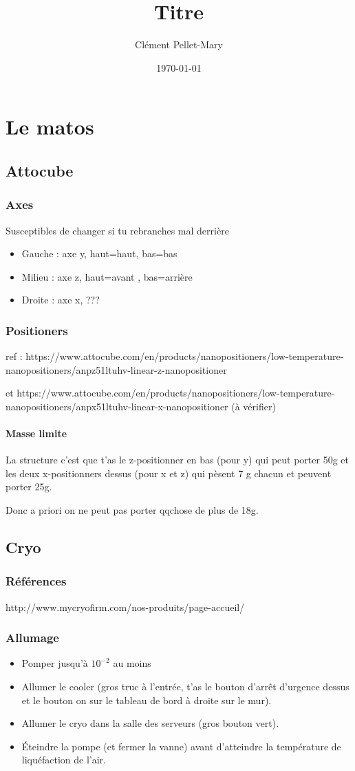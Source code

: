 \documentclass[a4paper]{report}
\title{Titre}
\author{Clément Pellet-Mary}
\date\today
\begin{document}
\chapter{Le matos}
  \section{Attocube}
  \subsection{Axes}
  Susceptibles de changer si tu rebranches mal derrière
  \begin{itemize}
  \item Gauche : axe y, haut=haut, bas=bas
  \item Milieu : axe z, haut=avant , bas=arrière
  \item Droite : axe x, ???
  \end{itemize}
  \subsection{Positioners}
  ref : https://www.attocube.com/en/products/nanopositioners/low-temperature-nanopositioners/anpz51ltuhv-linear-z-nanopositioner 
  
  et https://www.attocube.com/en/products/nanopositioners/low-temperature-nanopositioners/anpx51ltuhv-linear-x-nanopositioner (à vérifier)
  
  \subsubsection{Masse limite}
  La structure c'est que t'as le z-positionner en bas (pour y) qui peut porter 50g et les deux x-positionners dessus (pour x et z) qui pèsent 7 g chacun et peuvent porter 25g.
  
  Donc a priori on ne peut pas porter qqchose de plus de 18g.
  \section{Cryo}
  \subsection{Références}
  http://www.mycryofirm.com/nos-produits/page-accueil/
  \subsection{Allumage}
  \begin{itemize}
  \item Pomper jusqu'à $10^{-2}$ au moins
  \item Allumer le cooler (gros truc à l'entrée, t'as le bouton d'arrêt d'urgence dessus et le bouton on sur le tableau de bord à droite sur le mur).
  \item Allumer le cryo dans la salle des serveurs (gros bouton vert).
  \item Éteindre la pompe (et fermer la vanne) avant d'atteindre la température de liquéfaction de l'air.
  \end{itemize}
\end{document}
